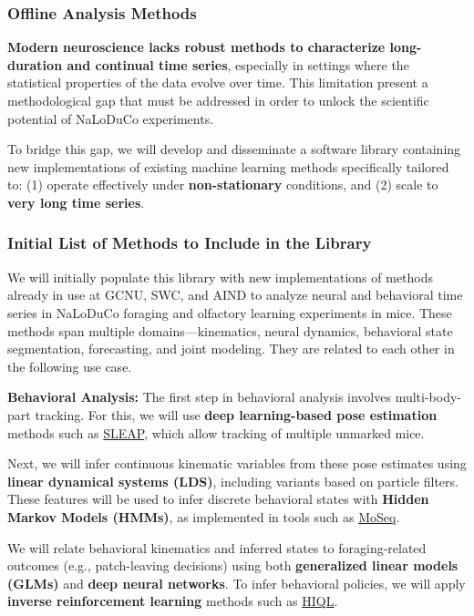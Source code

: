 \subsubsection{Offline Analysis Methods}
\label{sec:offlineAnalysisMethods}

\textbf{Modern neuroscience lacks robust methods to characterize long-duration
and continual time series}, especially in settings where the statistical
properties of the data evolve over time. This limitation present a
methodological gap that must be addressed in order to unlock the scientific
potential of NaLoDuCo experiments.

To bridge this gap, we will develop and disseminate a software library
containing new implementations of existing machine learning methods
specifically tailored to: (1) operate effectively under \textbf{non-stationary}
conditions, and (2) scale to \textbf{very long time series}.

\subsubsection*{Initial List of Methods to Include in the Library}
\label{sec:initialListOfMethods}

We will initially populate this library with new implementations of methods
already in use at GCNU, SWC, and AIND to analyze neural and behavioral time
series in NaLoDuCo foraging and olfactory learning experiments in mice. These
methods span multiple domains—kinematics, neural dynamics, behavioral state
segmentation, forecasting, and joint modeling. They are related to each other
in the following use case.

\vspace{1em}
\noindent\textbf{Behavioral Analysis:}
The first step in behavioral analysis involves multi-body-part tracking. For
this, we will use \textbf{deep learning-based pose estimation} methods such as
\href{https://github.com/talmolab/sleap}{SLEAP}, which allow tracking of
multiple unmarked mice.

Next, we will infer continuous kinematic variables from these pose estimates
using \textbf{linear dynamical systems (LDS)}, including variants based on
particle filters. These features will be used to infer discrete behavioral
states with \textbf{Hidden Markov Models (HMMs)}, as implemented in tools such
as \href{https://dattalab.github.io/moseq2-website/index.html}{MoSeq}.

We will relate behavioral kinematics and inferred states to foraging-related
outcomes (e.g., patch-leaving decisions) using both \textbf{generalized linear
models (GLMs)} and \textbf{deep neural networks}.
%
To infer behavioral policies,
we will apply \textbf{inverse reinforcement learning} methods such as
\href{https://github.com/haozhu10015/hiql}{HIQL}.


